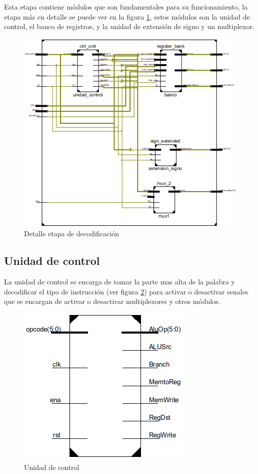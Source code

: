 Esta etapa contiene m\'odulos que son fundamentales para su funcionamiento, la etapa m\'as en detalle se puede ver en la figura \ref{fig:decodedetail}, estos m\'odulos son la unidad de control, el banco de registros, y la unidad de extensi\'on de signo y un multiplexor.

\begin{figure}[H]
\centering
\includegraphics[scale=0.7]{img/decode_stage_inside}
\caption{Detalle etapa de decodificaci\'on}
\label{fig:decodedetail}
\end{figure} 

\subsection{Unidad de control}
La unidad de control se encarga de tomar la parte mas alta de la palabra y decodificar el tipo de instrucci\'on (ver figura \ref{fig:ctrl_unit}) para activar o desactivar senales que se encargan de activar o desactivar multiplexores y otros m\'odulos.

\begin{figure}[H]
\centering
\includegraphics[scale=0.5]{img/unidad_control}
\caption{Unidad de control}
\label{fig:ctrl_unit}
\end{figure} 

